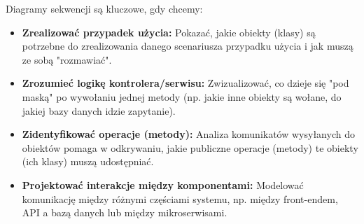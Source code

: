 \documentclass[a4paper,12pt]{article}
\begin{document}
Diagramy sekwencji są kluczowe, gdy chcemy:
\begin{itemize}
    \item \textbf{Zrealizować przypadek użycia:} Pokazać, jakie obiekty (klasy) są potrzebne do zrealizowania danego scenariusza przypadku użycia i jak muszą ze sobą "rozmawiać".
    \item \textbf{Zrozumieć logikę kontrolera/serwisu:} Zwizualizować, co dzieje się "pod maską" po wywołaniu jednej metody (np. jakie inne obiekty są wołane, do jakiej bazy danych idzie zapytanie).
    \item \textbf{Zidentyfikować operacje (metody):} Analiza komunikatów wysyłanych do obiektów pomaga w odkrywaniu, jakie publiczne operacje (metody) te obiekty (ich klasy) muszą udostępniać.
    \item \textbf{Projektować interakcje między komponentami:} Modelować komunikację między różnymi częściami systemu, np. między front-endem, API a bazą danych lub między mikroserwisami.
\end{itemize}
\end{document}
